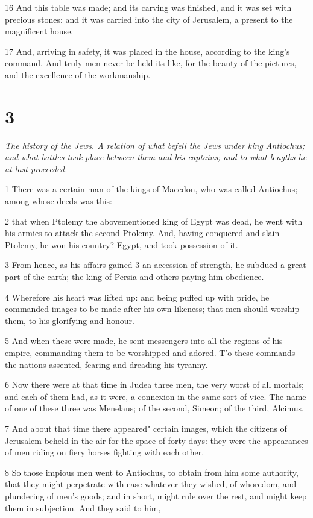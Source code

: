 16 And this table was made; and its carving was finished, and it was set with precious stones: and it was carried into the city of Jerusalem, a present to the magnificent house. 

17 And, arriving in safety, it was placed in the house, according to the king’s command. And truly men never be held its like, for the beauty of the pictures, and the excellence of the workmanship. 

\chapter{3}

\par \textit{The history of the Jews. A relation of what befell the Jews under king Antiochus; and what battles took place between them and his captains; and to what lengths he at last proceeded.}

1 There was a certain man of the kings of Macedon, who was called Antiochus; among whose deeds was this: 

2 that when Ptolemy the abovementioned king of Egypt was dead, he went with his armies to attack the second Ptolemy. And, having conquered and slain Ptolemy, he won his country? Egypt, and took possession of it. 

3 From hence, as his affairs gained 3 an accession of strength, he subdued a great part of the earth; the king of Persia and others paying him obedience. 

4 Wherefore his heart was lifted up: and being puffed up with pride, he commanded images to be made after his own likeness; that men should worship them, to his glorifying and honour. 

5 And when these were made, he sent messengers into all the regions of his empire, commanding them to be worshipped and adored. T’o these commands the nations assented, fearing and dreading his tyranny. 

6 Now there were at that time in Judea three men, the very worst of all mortals; and each of them had, as it were, a connexion in the same sort of vice. The name of one of these three was Menelaus; of the second, Simeon; of the third, Alcimus. 

7 And about that time there appeared" certain images, which the citizens of Jerusalem beheld in the air for the space of forty days: they were the appearances of men riding on fiery horses fighting with each other. 

8 So those impious men went to Antiochus, to obtain from him some authority, that they might perpetrate with ease whatever they wished, of whoredom, and plundering of men’s goods; and in short, might rule over the rest, and might keep them in subjection. And they said to him, 

